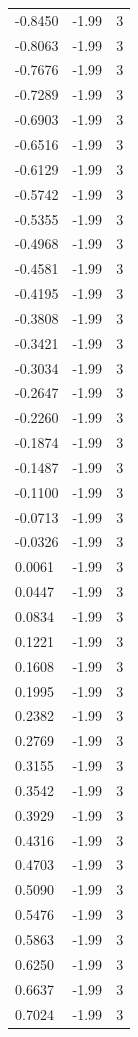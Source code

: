 \begin{longtable}{lrr}
  -0.8450 & -1.99 & 3 \\
  -0.8063 & -1.99 & 3 \\
  -0.7676 & -1.99 & 3 \\
  -0.7289 & -1.99 & 3 \\
  -0.6903 & -1.99 & 3 \\
  -0.6516 & -1.99 & 3 \\
  -0.6129 & -1.99 & 3 \\
  -0.5742 & -1.99 & 3 \\
  -0.5355 & -1.99 & 3 \\
  -0.4968 & -1.99 & 3 \\
  -0.4581 & -1.99 & 3 \\
  -0.4195 & -1.99 & 3 \\
  -0.3808 & -1.99 & 3 \\
  -0.3421 & -1.99 & 3 \\
  -0.3034 & -1.99 & 3 \\
  -0.2647 & -1.99 & 3 \\
  -0.2260 & -1.99 & 3 \\
  -0.1874 & -1.99 & 3 \\
  -0.1487 & -1.99 & 3 \\
  -0.1100 & -1.99 & 3 \\
  -0.0713 & -1.99 & 3 \\
  -0.0326 & -1.99 & 3 \\
  0.0061 & -1.99 & 3 \\
  0.0447 & -1.99 & 3 \\
  0.0834 & -1.99 & 3 \\
  0.1221 & -1.99 & 3 \\
  0.1608 & -1.99 & 3 \\
  0.1995 & -1.99 & 3 \\
  0.2382 & -1.99 & 3 \\
  0.2769 & -1.99 & 3 \\
  0.3155 & -1.99 & 3 \\
  0.3542 & -1.99 & 3 \\
  0.3929 & -1.99 & 3 \\
  0.4316 & -1.99 & 3 \\
  0.4703 & -1.99 & 3 \\
  0.5090 & -1.99 & 3 \\
  0.5476 & -1.99 & 3 \\
  0.5863 & -1.99 & 3 \\
  0.6250 & -1.99 & 3 \\
  0.6637 & -1.99 & 3 \\
  0.7024 & -1.99 & 3 \\

\end{longtable}
